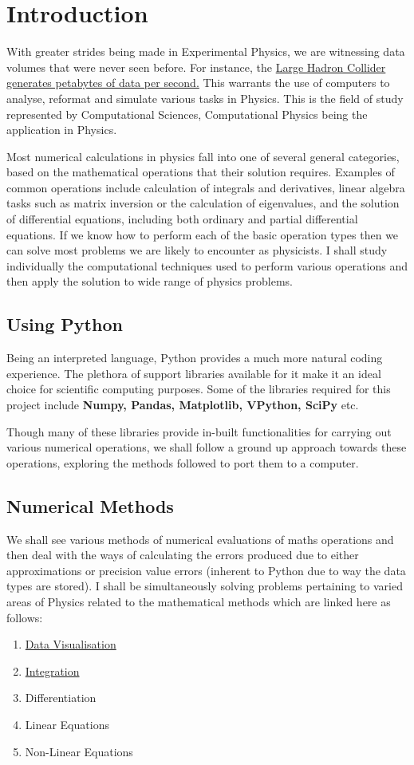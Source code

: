 \section{Introduction}
	\par With greater strides being made in Experimental Physics, we are witnessing data volumes that were never seen before. For instance, the \href{https://home.cern/news/news/computing/cern-data-centre-passes-200-petabyte-milestone}{Large Hadron Collider generates petabytes of data per second.} This warrants the use of computers to analyse, reformat and simulate various tasks in Physics. This is the field of study represented by Computational Sciences, Computational Physics being the application in Physics.\medskip
	\par Most numerical calculations in physics fall into one of several general categories, based on the mathematical operations that their solution requires. Examples of common operations include calculation of integrals and derivatives, linear algebra tasks such as matrix inversion or the calculation of eigenvalues, and the solution of differential equations, including both ordinary and partial differential equations. 
     If we know how to perform each of the basic operation types then we can solve most problems we are likely to encounter as physicists. I shall study individually the computational techniques used to perform various operations and then apply the solution to wide range of physics problems.
\subsection{Using Python}
Being an interpreted language, Python provides a much more natural coding experience. The plethora of support libraries available for it make it an ideal choice for scientific computing purposes. Some of the libraries required for this project include \textbf{Numpy, Pandas, Matplotlib, VPython, SciPy} etc. 
	\par Though many of these libraries provide in-built functionalities for carrying out various numerical operations, we shall follow a ground up approach towards these operations, exploring the methods followed to port them to a computer.
\subsection{Numerical Methods}
We shall see various methods of numerical evaluations of maths operations and then deal with the ways of calculating the errors produced due to either approximations or precision value errors (inherent to Python due to way the data types are stored). I shall be simultaneously solving problems pertaining to varied areas of Physics related to the mathematical methods which are linked here as follows:
 
\begin{enumerate}
	\item \hyperlink{section.2}{Data Visualisation}
	\item \hyperlink{section.3}{Integration}
	\item Differentiation
	\item Linear Equations
	\item Non-Linear Equations
\end{enumerate}